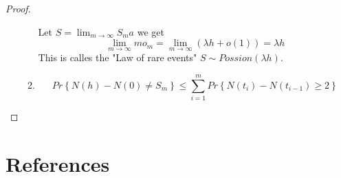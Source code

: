 \documentclass{article}
\theoremstyle{remark}
\newcommand{\newpara}
  {
  \vskip 0.4cm
  }
\begin{document}
\begin{proof}
\begin{itemize}
\begin{enumerate}[label=(\roman*)]
  \newpara
  Let $S = \lim_{m\to  \infty}  S_{m}a $ we get \[
  \lim_{m\to \infty}  mo_{m} = \lim_{m\to \infty}  \left( \lambda h + o \left( 1 \right)  \right) = \lambda h
  \] 
  This is calles the "Law of rare events" $S \sim Possion\left( \lambda h \right)$. 
\item \[
Pr \left \{  N\left( h \right)- N\left( 0 \right)\neq S_{m} \right \}  \le \sum_{i=1}^{m} Pr \left \{ N\left( t_{i} \right) - N\left( t_{i-1} \right) \ge 2 \right \} 
\] 
  \end{enumerate}
  \end{itemize}
\end{proof}
\section{References}
\label{sec:references}





\end{document}
